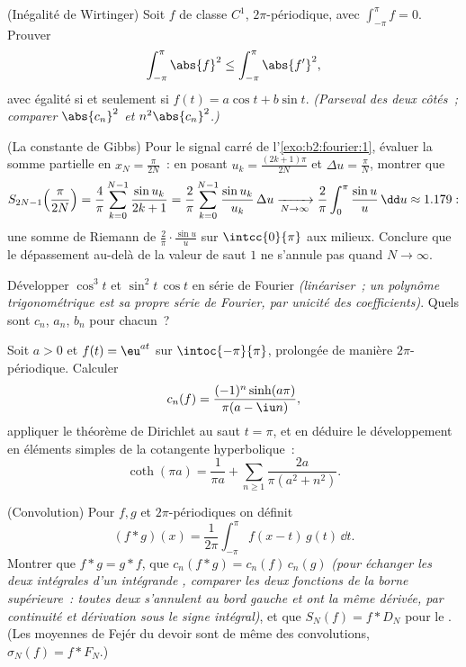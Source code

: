 \begin{exercise}[$\star\star\star$]\label{exo:b2:fourier:7}
(Inégalité de Wirtinger) Soit $f$ de classe $C^1$, $2\pi$-périodique,
avec $\int_{-\pi}^{\pi} f = 0$. Prouver
\[
\int_{-\pi}^{\pi} \abs{f}^2 \leq \int_{-\pi}^{\pi} \abs{f'}^2 ,
\]
avec égalité si et seulement si $f(t) = a\cos t + b\sin t$.
\emph{(Parseval des deux côtés~; comparer $\abs{c_n}^2$ et
$n^2\abs{c_n}^2$.)}
\end{exercise}

\begin{exercise}[$\star\star\star$]\label{exo:b2:fourier:8}
(La constante de Gibbs) Pour le signal carré de
l'\cref{exo:b2:fourier:1}, évaluer la somme partielle en $x_N =
\frac{\pi}{2N}$~: en posant $u_k = \frac{(2k+1)\pi}{2N}$ et $\Delta u
= \frac{\pi}{N}$, montrer que
\[
S_{2N-1}\Bigl(\frac{\pi}{2N}\Bigr)
= \frac{4}{\pi}\sum_{k=0}^{N-1} \frac{\sin u_k}{2k+1}
= \frac{2}{\pi}\sum_{k=0}^{N-1} \frac{\sin u_k}{u_k}\,\Delta u
\xrightarrow[N\to\infty]{}
\frac{2}{\pi}\int_0^{\pi}\frac{\sin u}{u}\,\dd u \approx 1.179 :
\]
une somme de Riemann de $\frac{2}{\pi}\cdot\frac{\sin u}{u}$ sur
$\intcc{0}{\pi}$ aux milieux. Conclure que le dépassement au-delà de
la valeur de saut $1$ ne s'annule pas quand $N \to \infty$.
\end{exercise}

\begin{exercise}[$\star$]\label{exo:b2:fourier:9}
Développer $\cos^3 t$ et $\sin^2 t\,\cos t$ en série de Fourier
\emph{(linéariser~; un polynôme trigonométrique est sa propre série
de Fourier, par unicité des coefficients)}. Quels sont $c_n$, $a_n$,
$b_n$ pour chacun~?
\end{exercise}

\begin{exercise}[$\star\star$]\label{exo:b2:fourier:10}
Soit $a > 0$ et $f(t) = \eu^{at}$ sur $\intoc{-\pi}{\pi}$, prolongée
de manière $2\pi$-périodique. Calculer
\[
c_n(f) = \frac{(-1)^n\sinh(a\pi)}{\pi(a - \iu n)} ,
\]
appliquer le théorème de Dirichlet au saut $t = \pi$, et en déduire
le développement en éléments simples de la cotangente hyperbolique~:
\[
\coth(\pi a) = \frac{1}{\pi a} + \sum_{n\geq1}
\frac{2a}{\pi(a^2 + n^2)} .
\]
\end{exercise}

\begin{exercise}[$\star\star$]\label{exo:b2:fourier:11}
(Convolution) Pour $f, g$  et $2\pi$-périodiques on définit
\[
(f * g)(x) = \frac{1}{2\pi}\int_{-\pi}^{\pi} f(x - t)\,g(t)\,
\dd t .
\]
Montrer que $f * g = g * f$, que $c_n(f*g) = c_n(f)\,c_n(g)$
\emph{(pour échanger les deux intégrales d'un intégrande ,
comparer les deux fonctions de la borne supérieure~: toutes deux
s'annulent au bord gauche et ont la même dérivée, par continuité et
dérivation sous le signe intégral)}, et que $S_N(f) = f * D_N$ pour le
. (Les moyennes de Fejér du devoir sont de même des
convolutions, $\sigma_N(f) = f * F_N$.)
\end{exercise}


